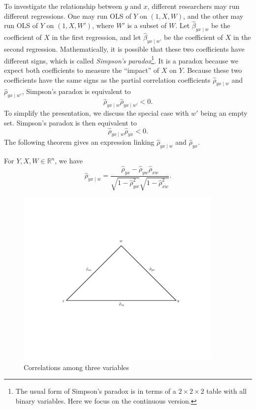  
To investigate the relationship between $y$ and $x$, different researchers
may run different regressions. One may run OLS of $Y$ on $(1, X ,W)$, and the other may run OLS of $Y$ on $(1, X ,W')$,
where $W'$ is a subset of $W$. Let $\hat{\beta}_{yx\mid w}$ be
the coefficient of $X$ in the first regression, and let $\hat{\beta}_{yx\mid w'}$
be the coefficient of $X$ in the second regression. Mathematically,
it is possible that these two coefficients have different signs, which
is called {\it Simpson's paradox}\footnote{The usual form of Simpson's paradox is in terms of a $2\times 2\times 2$ table with all binary variables. Here we focus on the continuous version.}. It is a paradox because we expect both
coefficients to measure the ``impact'' of $X$ on $Y$. Because these two coefficients have the same signs as the partial
correlation coefficients $ \hat{\rho}_ {yx\mid w}$ and $ \hat{\rho}_ {yx\mid w'}$, Simpson's
paradox is equivalent to 
\[
 \hat{\rho}_ {yx\mid w} \hat{\rho}_ {yx\mid w'}<0.
\]
To simplify the presentation, we discuss the special case with $w'$
being an empty set. Simpson's
paradox is then equivalent to 
\[
 \hat{\rho}_ {yx\mid w} \hat{\rho}_ {yx}<0.
\]
The following theorem gives an expression linking $ \hat{\rho}_ {yx\mid w}$ and $ \hat{\rho}_ {yx}$. 


\begin{theorem}\label{thm::sample-partialcorr-corr}
For $Y,X,W\in\mathbb{R}^{n}$, we have 
\[
 \hat{\rho}_ {yx\mid w}=\frac{ \hat{\rho}_ {yx}- \hat{\rho}_ {yw} \hat{\rho}_ {xw}}{\sqrt{1- \hat{\rho}_ {yw}^{2}}\sqrt{1- \hat{\rho}_ {xw}^{2}}}.
\]
\end{theorem}
 
 
 
 
\begin{figure}
\centering
\includegraphics[width = 0.9\textwidth]{figures/partialcorrelationtriangle.pdf}
\caption{Correlations among three variables}\label{fig::correlations3}
\end{figure} 
 
